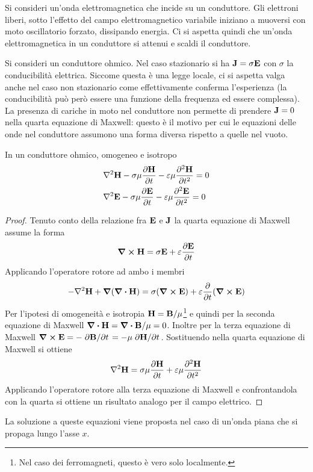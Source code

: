 Si consideri un'onda elettromagnetica che incide su un conduttore. Gli elettroni liberi, sotto
l'effetto del campo elettromagnetico variabile
iniziano a muoversi con moto oscillatorio forzato, dissipando energia.
Ci si aspetta quindi che un'onda elettromagnetica in un conduttore si attenui e scaldi il conduttore.

Si consideri un conduttore ohmico. Nel caso stazionario si ha $\vb{J}=\sigma \vb{E}$ con $\sigma$ la
conducibilità elettrica. Siccome questa è una legge locale, ci si aspetta valga anche nel caso non
stazionario come effettivamente conferma l'esperienza (la conducibilità può però essere una funzione
della frequenza ed essere complessa).
La presenza di cariche in moto nel conduttore non permette di prendere $\vb{J}=0$
nella quarta equazione di Maxwell: questo è il motivo per cui le equazioni delle onde
nel conduttore assumono una forma diversa rispetto a quelle nel vuoto.
\begin{thm}
    In un conduttore ohmico, omogeneo e isotropo
    \[
        \begin{split}
            & \laplacian{\vb{H}}-\sigma\mu\pdv{\vb{H}}{t}-\epsilon\mu\pdv[2]{\vb{H}}{t}=0\\
            & \laplacian{\vb{E}}-\sigma\mu\pdv{\vb{E}}{t}-\epsilon\mu\pdv[2]{\vb{E}}{t}=0
        \end{split}
    \]
\end{thm}
\begin{proof}
    Tenuto conto della relazione fra $\vb{E}$ e $\vb{J}$ la quarta equazione di Maxwell assume la forma
    \[
        \curl{\vb{H}}=\sigma \vb{E} +\varepsilon \pdv{\vb{E}}{t}
    \]
    Applicando l'operatore rotore ad ambo i membri
    \[
        -\laplacian{\vb{H}} +\grad(\div{\vb{H}})=\sigma(\curl{\vb{E}}) + \epsilon \pdv{t}(\curl{\vb{E}})
    \]
    Per l'ipotesi di omogeneità e isotropia $\vb{H}=\vb{B}/\mu$\footnote{Nel caso dei ferromagneti, questo
    è vero solo localmente.} e quindi per la seconda equazione di Maxwell
    $\div{\vb{H}}=\div{\vb{B}}/\mu=0$. Inoltre per la terza equazione di Maxwell
    $\curl{\vb{E}}=-\pdv*{\vb{B}}{t}=-\mu\pdv*{\vb{H}}{t}$. Sostituendo nella quarta equazione di Maxwell
    si ottiene
    \[
        \laplacian{\vb{H}}=\sigma\mu\pdv{\vb{H}}{t}+\epsilon\mu\pdv[2]{\vb{H}}{t}
    \]
    Applicando l'operatore rotore alla terza equazione di Maxwell e confrontandola con la quarta
    si ottiene un risultato analogo per il campo elettrico.
\end{proof}
La soluzione a queste equazioni viene proposta nel caso di un'onda piana che si propaga lungo l'asse $x$.
